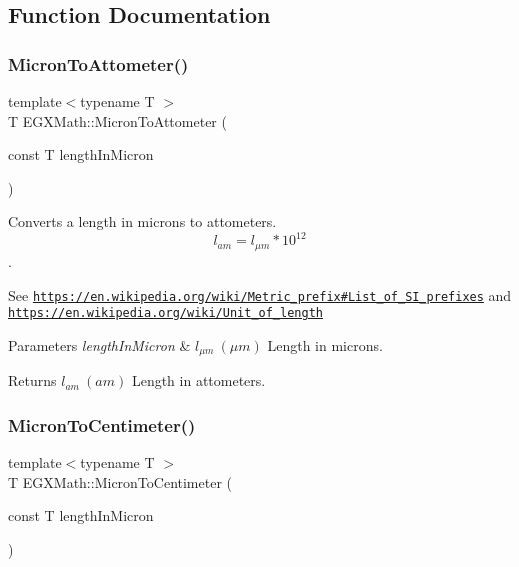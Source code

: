 \subsection{Function Documentation}
\mbox{\label{group___e_g_x_math-_conversions-_length_conversions-_non-_s_i-_micron-_s_i_ga6afa3c6c25d1bbab9a96751f3a9eb1e9}} 
\subsubsection{\texorpdfstring{Micron\+To\+Attometer()}{MicronToAttometer()}}
{\footnotesize\ttfamily template$<$typename T $>$ \\
T E\+G\+X\+Math\+::\+Micron\+To\+Attometer (\begin{DoxyParamCaption}\item[{const T}]{length\+In\+Micron }\end{DoxyParamCaption})}



Converts a length in microns to attometers. \[ l_{am}=l_{\mu m} * 10^{12} \]. 

See \href{https://en.wikipedia.org/wiki/Metric_prefix#List_of_SI_prefixes}{\tt https\+://en.\+wikipedia.\+org/wiki/\+Metric\+\_\+prefix\#\+List\+\_\+of\+\_\+\+S\+I\+\_\+prefixes} and \href{https://en.wikipedia.org/wiki/Unit_of_length}{\tt https\+://en.\+wikipedia.\+org/wiki/\+Unit\+\_\+of\+\_\+length} 
\begin{DoxyParams}{Parameters}
{\em length\+In\+Micron} & $ l_{\mu m}\ (\mu m)$ Length in microns. \\
\hline
\end{DoxyParams}
\begin{DoxyReturn}{Returns}
$ l_{am}\ (am)$ Length in attometers. 
\end{DoxyReturn}
\mbox{\label{group___e_g_x_math-_conversions-_length_conversions-_non-_s_i-_micron-_s_i_gac987114703e1d7672646b3835f56d78b}} 
\subsubsection{\texorpdfstring{Micron\+To\+Centimeter()}{MicronToCentimeter()}}
{\footnotesize\ttfamily template$<$typename T $>$ \\
T E\+G\+X\+Math\+::\+Micron\+To\+Centimeter (\begin{DoxyParamCaption}\item[{const T}]{length\+In\+Micron }\end{DoxyParamCaption})}



